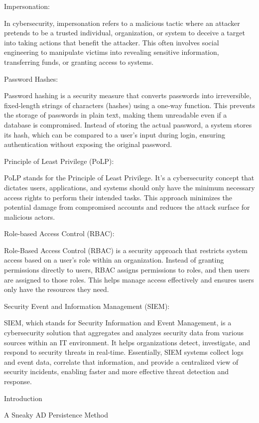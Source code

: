 Impersonation:

In cybersecurity, impersonation refers to a malicious tactic where an attacker pretends to be a trusted individual, organization, or system to deceive a target into taking actions that benefit the attacker. This often involves social engineering to manipulate victims into revealing sensitive information, transferring funds, or granting access to systems.

Password Hashes:

Password hashing is a security measure that converts passwords into irreversible, fixed-length strings of characters (hashes) using a one-way function. This prevents the storage of passwords in plain text, making them unreadable even if a database is compromised. Instead of storing the actual password, a system stores its hash, which can be compared to a user's input during login, ensuring authentication without exposing the original password.

Principle of Least Privilege (PoLP):

PoLP stands for the Principle of Least Privilege. It's a cybersecurity concept that dictates users, applications, and systems should only have the minimum necessary access rights to perform their intended tasks. This approach minimizes the potential damage from compromised accounts and reduces the attack surface for malicious actors.

Role-based Access Control (RBAC):

Role-Based Access Control (RBAC) is a security approach that restricts system access based on a user's role within an organization. Instead of granting permissions directly to users, RBAC assigns permissions to roles, and then users are assigned to those roles. This helps manage access effectively and ensures users only have the resources they need.

Security Event and Information Management (SIEM):

SIEM, which stands for Security Information and Event Management, is a cybersecurity solution that aggregates and analyzes security data from various sources within an IT environment. It helps organizations detect, investigate, and respond to security threats in real-time. Essentially, SIEM systems collect logs and event data, correlate that information, and provide a centralized view of security incidents, enabling faster and more effective threat detection and response.

Introduction

A Sneaky AD Persistence Method

